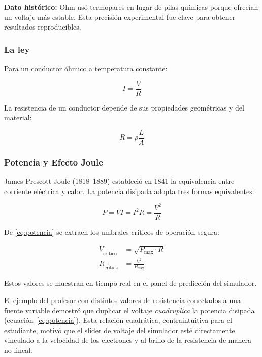 \documentclass[12pt, a4paper]{article}
\newcommand{\Vcrit}{V_{\mathrm{cr\acute{i}tico}}}
\newcommand{\Rcrit}{R_{\mathrm{cr\acute{i}tica}}}
\begin{document}
\begin{cajahist}
\textbf{Dato histórico:} Ohm usó termopares en lugar de pilas químicas
porque ofrecían un voltaje más estable. Esta precisión experimental fue
clave para obtener resultados reproducibles.
\end{cajahist}

\subsubsection{La ley}

Para un conductor óhmico a temperatura constante:

\begin{equation}
  I = \frac{V}{R}
  \label{eq:ohm}
\end{equation}

La resistencia de un conductor depende de sus propiedades geométricas y
del material:

\begin{equation}
  R = \rho \frac{L}{A}
  \label{eq:resistividad}
\end{equation}

\subsubsection{Potencia y Efecto Joule}

James Prescott Joule (1818--1889) estableció en 1841 la equivalencia entre
corriente eléctrica y calor. La potencia disipada adopta tres formas
equivalentes:

\begin{equation}
  P = VI = I^2 R = \frac{V^2}{R}
  \label{eq:potencia}
\end{equation}

De \eqref{eq:potencia} se extraen los umbrales críticos de operación segura:

\begin{align}
  \Vcrit &= \sqrt{P_{\max} \cdot R}  \label{eq:vcrit} \\
  \Rcrit &= \frac{V^2}{P_{\max}}     \label{eq:rcrit}
\end{align}

Estos valores se muestran en tiempo real en el panel de predicción del
simulador.

\begin{cajaclas}
El ejemplo del profesor con distintos valores de resistencia conectados a
una fuente variable demostró que duplicar el voltaje \emph{cuadruplica} la
potencia disipada (ecuación~\eqref{eq:potencia}). Esta relación cuadrática,
contraintuitiva para el estudiante, motivó que el slider de voltaje del
simulador esté directamente vinculado a la velocidad de los electrones y al
brillo de la resistencia de manera no lineal.
\end{cajaclas}
\end{document}
